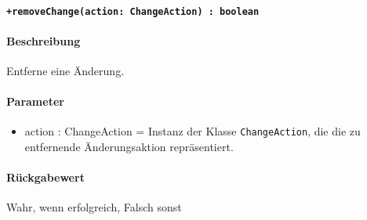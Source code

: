 \paragraph{\texttt{+removeChange(action: ChangeAction) : boolean}}%
\paragraph*{Beschreibung}
Entferne eine Änderung.
\paragraph*{Parameter}
\begin{itemize}
    \item action : ChangeAction = Instanz der Klasse \verb#ChangeAction#, die die zu entfernende Änderungsaktion repräsentiert.
\end{itemize}
\paragraph*{Rückgabewert}
Wahr, wenn erfolgreich, Falsch sonst
